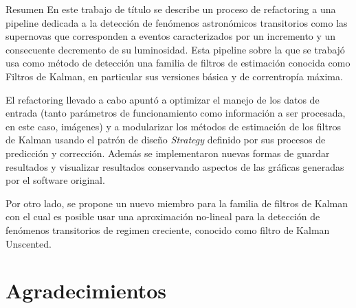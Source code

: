 \begin{preface}
Resumen
En este trabajo de t\'itulo se describe un proceso de refactoring a una pipeline dedicada a la detecci\'on de fen\'omenos astron\'omicos transitorios como las supernovas que corresponden a eventos caracterizados por un incremento y un consecuente decremento de su luminosidad. Esta pipeline sobre la que se trabaj\'o usa como m\'etodo de detecci\'on una familia de filtros de estimaci\'on conocida como Filtros de Kalman, en particular sus versiones b\'asica y de correntrop\'ia m\'axima.
\bigskip

El refactoring llevado a cabo apunt\'o a optimizar el manejo de los datos de entrada (tanto par\'ametros de funcionamiento como informaci\'on a ser procesada, en este caso, im\'agenes) y a modularizar los m\'etodos de estimaci\'on de los filtros de Kalman usando el patr\'on de dise\~no \textit{Strategy} definido por sus procesos de predicci\'on y correcci\'on. Adem\'as se  implementaron nuevas formas de guardar resultados y visualizar resultados conservando aspectos de las gr\'aficas generadas por el software original. 
\bigskip

Por otro lado, se propone un nuevo miembro para la familia de filtros de Kalman con el cual es posible usar una aproximaci\'on no-lineal para la detecci\'on de fen\'omenos transitorios de regimen creciente, conocido como filtro de Kalman Unscented.




\section{Agradecimientos}

\begin{flushright}
\makeatletter
	\@author
\makeatother
\end{flushright}

\tableofcontents

\listoftables

\listoffigures

\end{preface}